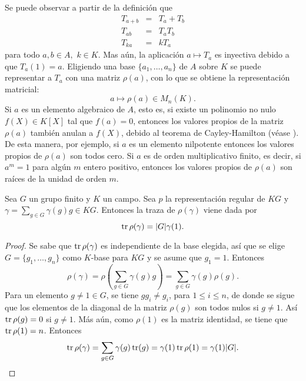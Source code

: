 Se puede observar a partir de la definición que
\begin{eqnarray*}
T_{a+b} &=& T_a + T_b \\
T_{ab} &=& T_aT_b \\
T_{ka} &=& kT_a
\end{eqnarray*}
para todo $a,b \in A,$  $k\in K$. Mas aún, la aplicación $a \mapsto T_a$ es inyectiva debido a que $T_a(1) = a$. Eligiendo una base $\{ a_1, \dots, a_n \}$ de $A$ sobre $K$ se puede representar a $T_a$ con una matriz $\rho(a)$, con lo que  se obtiene la representación matricial:
\begin{equation*}
a \mapsto \rho(a) \in M_n(K).
\end{equation*}
Si $a$ es un elemento algebraico de $A$, esto es, si existe un polinomio no nulo $f(X) \in K[X]$ tal que $f(a) = 0$, entonces los valores propios de la matriz $\rho(a)$ también anulan a $f(X)$, debido al teorema de Cayley-Hamilton (véase \cite[p. 241]{bib:lang}). De esta manera, por ejemplo, si $a$ es un elemento nilpotente entonces los valores propios de $\rho(a)$ son todos cero. Si $a$ es de orden multiplicativo finito, es decir, si $a^m = 1$ para algún $m$ entero positivo, entonces los valores propios de $\rho(a)$ son raíces de la unidad de orden $m$. 
\begin{lema}\label{lem:traza}
Sea $G$ un grupo finito y $K$ un campo. Sea $p$ la representación regular de $KG$ y $\gamma = \sum_{g \in G}\gamma(g)g \in KG$. Entonces la traza de $\rho(\gamma)$ viene dada por
\begin{equation*}
\operatorname{tr}\rho(\gamma) = |G|\gamma(1).
\end{equation*}
\end{lema} 
\begin{proof}
Se sabe que $\operatorname{tr}\rho(\gamma)$ es independiente de la base elegida, así que se elige $G=\{g_1, \dots, g_n \}$ como $K$-base para $KG$ y se asume que $g_1=1$.
Entonces
\begin{equation*}
\rho(\gamma) = \rho\left( \sum_{g \in G}\gamma(g)g \right) = \sum_{g \in G}\gamma(g)\rho(g) .
\end{equation*}
Para un elemento $g\neq 1 \in G$, se tiene $gg_i \neq g_i$, para $1\leq i\leq n$, de donde se sigue que los elementos de la diagonal de la matriz $\rho(g)$ son todos nulos si $g \neq 1$. Así $\operatorname{tr}\rho(g) = 0$ si $g \neq 1$. Más aún, como $\rho(1)$ es la matriz identidad, se tiene que $\operatorname{tr}\rho(1) = n$. Entonces
\begin{equation*}
\operatorname{tr}\rho(\gamma) = \sum_{g \in G}\gamma(g)\operatorname{tr}(g) = \gamma(1)\operatorname{tr}\rho(1) = \gamma(1)|G|.\qedhere
\end{equation*} 
\end{proof}


